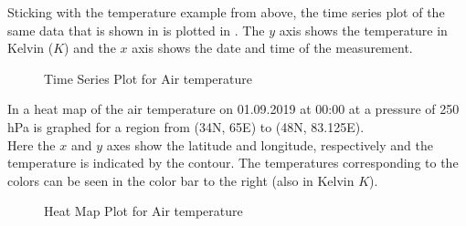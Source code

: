 \documentclass[../00_main.tex]{subfiles}
\begin{document}
Sticking with the temperature example from above, the time series plot of the
same data that is shown in  is plotted in .
The $y$ axis shows the temperature in Kelvin ($K$) and the $x$ axis shows the
date and time of the measurement.
\begin{figure}[h]
    \center
    \caption{Time Series Plot for Air temperature}
    \label{plt:dpl01}
\end{figure}
In  a heat map of the air temperature on 01.09.2019 at 00:00
at a pressure of 250 hPa is graphed for a region from (34\textdegree{}N,
65\textdegree{}E) to (48\textdegree{}N, 83.125\textdegree{}E).\\
Here the $x$ and
$y$ axes show the latitude and longitude, respectively and the temperature is
indicated by the contour. The temperatures corresponding to the colors can be
seen in the color bar to the right (also in Kelvin $K$).
\begin{figure}[H]
    \center
    \caption{Heat Map Plot for Air temperature}
    \label{plt:dpl02}
\end{figure}
\end{document}
